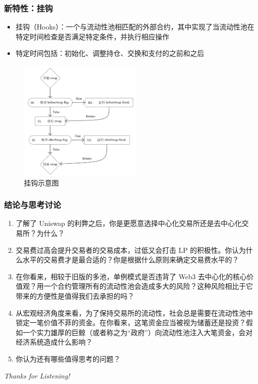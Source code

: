\documentclass{beamer}
\begin{document}
\begin{frame}
    \frametitle{新特性：挂钩}

    \begin{itemize}
        \item 挂钩（Hooks）：一个与流动性池相匹配的外部合约，其中实现了当流动性池在特定时间检查是否满足特定条件，并执行相应操作
        \item 特定时间包括：初始化、调整持仓、交换和支付的之前和之后
    \end{itemize}

    \begin{figure}[htbp]
        \centering
        \includegraphics[width=6cm]{../notes/Hooks.png}
        \caption{挂钩示意图}
    \end{figure}
\end{frame}

\begin{frame}
    \frametitle{结论与思考讨论}

    \begin{enumerate}
        \item 了解了 Uniswap 的利弊之后，你是更愿意选择中心化交易所还是去中心化交易所？为什么？
        \item 交易费过高会提升交易者的交易成本，过低又会打击 LP 的积极性。你认为什么水平的交易费才是最合适的？你是根据什么原则来确定交易费水平的？
        \item 在你看来，相较于旧版的多池，单例模式是否违背了 Web3 去中心化的核心价值观？用一个合约管理所有的流动性池会造成多大的风险？这种风险相比于它带来的方便性是值得我们去承担的吗？
        \item 从宏观经济角度来看，为了保持交易所的流动性，社会总是需要在流动性池中锁定一笔价值不菲的资金。在你看来，这笔资金应当被视为储蓄还是投资？假如一个实力雄厚的巨鲸（或者称之为“政府”）向流动性池注入大笔资金，会对经济系统造成什么影响？
        \item 你认为还有哪些值得思考的问题？
    \end{enumerate}
\end{frame}

\begin{frame}
    \centering \Huge
    \emph{Thanks for Listening!}
\end{frame}
\end{document}
